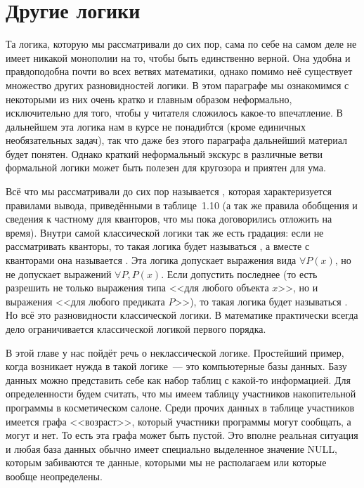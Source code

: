 \section{Другие логики}

Та логика, которую мы рассматривали до сих пор, сама по себе на самом деле не имеет никакой монополии на то, чтобы быть единственно верной. Она удобна и правдоподобна почти во всех ветвях математики, однако помимо неё существует множество других разновидностей логики. В этом параграфе мы ознакомимся с некоторыми из них очень кратко и главным образом неформально, исключительно для того, чтобы у читателя сложилось какое-то впечатление. В дальнейшем эта логика нам в курсе не понадибтся (кроме единичных необязательных задач), так что даже без этого параграфа дальнейший материал будет понятен. Однако краткий неформальный экскурс в различные ветви формальной логики может быть полезен для кругозора и приятен для ума.

Всё что мы рассматривали до сих пор называется , которая характеризуется правилами вывода, приведёнными в таблице~1.10 (а так же правила обобщения и сведения к частному для кванторов, что мы пока договорились отложить на время). Внутри самой классической логики так же есть градация: если не рассматривать кванторы, то такая логика будет называться , а вместе с кванторами она называется . Эта логика допускает выражения вида $\forall P(x)$, но не допускает выражений $\forall P, P(x)$. Если допустить последнее (то есть разрешить не только выражения типа <<для любого объекта $x$>>, но и выражения <<для любого предиката $P$>>), то такая логика будет называться . Но всё это разновидности классической логики. В математике практически всегда дело ограничивается классической логикой первого порядка.

В этой главе у нас пойдёт речь о неклассической логике. Простейший пример, когда возникает нужда в такой логике~--- это компьютерные базы данных. Базу данных можно представить себе как набор таблиц с какой-то информацией. Для определенности будем считать, что мы имеем таблицу участников накопительной программы в косметическом салоне. Среди прочих данных в таблице участников имеется графа <<возраст>>, который участники программы могут сообщать, а могут и нет. То есть эта графа может быть пустой. Это вполне реальная ситуация и любая база данных обычно имеет специально выделенное значение NULL, которым забиваются те данные, которыми мы не располагаем или которые вообще неопределены.

